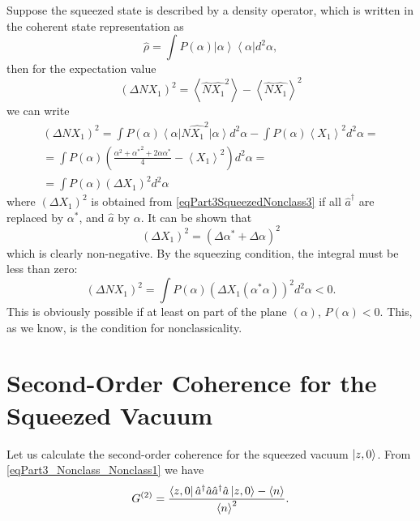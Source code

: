 Suppose the squeezed state is described by a density operator,
which is written in the coherent state representation as
\[
\hat{\rho} = \int P\left(\alpha\right)
\left|\alpha\right>
\left<\alpha\right| d^2 \alpha,
\]
then for the expectation value 
\begin{equation}
\left(\Delta N X_1\right)^2 = 
\left<\hat{N} \hat{X_1}^2\right> - \left<\hat{N} \hat{X_1}\right>^2 
\label{eqPart3SqueezedNonclass3}
\end{equation}
we can write
\begin{eqnarray}
  \left(\Delta N X_1\right)^2 =
  \int P\left(\alpha\right)
  \left<\alpha\right|
  \hat{N} \hat{X_1}^2
  \left|\alpha\right> d^2 \alpha -
  \int P\left(\alpha\right)
  \left< X_1 \right>^2
  d^2 \alpha
  =
  \nonumber \\
  =
  \int  
  P\left(\alpha\right)
  \left(
  \frac{
    \alpha^2 + {\alpha^\ast}^2 +
    2 \alpha \alpha^\ast}{4}
  - \left< X_1 \right>^2
  \right)
   d^2 \alpha
  =
  \nonumber \\
  =
 \int 
P\left(\alpha\right)
\left(\Delta X_1\right)^2
d^2 \alpha
\end{eqnarray}
where $\left(\Delta X_1\right)^2$ is obtained from
\eqref{eqPart3SqueezedNonclass3} if all $\hat{a}^{\dag}$ are replaced by
$\alpha^{*}$, and $\hat{a}$ by $\alpha$. It can be shown that
\[
\left(\Delta X_1\right)^2 = \left(\Delta \alpha^{*} + \Delta \alpha\right)^2
\]
which is clearly non-negative. By the squeezing condition, the integral must
be less than zero:
\begin{equation}
\left(\Delta N X_1\right)^2 = 
 \int 
P\left(\alpha\right)
\left(\Delta X_1\left(\alpha^{*}\alpha\right)\right)^2
d^2 \alpha < 0.
\nonumber
\end{equation}
This is obviously possible if at least on part of the plane
$\left(\alpha\right)$, $P\left(\alpha\right) < 0$. This, as we know,
is the condition for nonclassicality. 

\section{Second-Order Coherence for the Squeezed Vacuum}

Let us calculate the second-order coherence for the squeezed vacuum
$\ket{z, 0}$. From \eqref{eqPart3_Nonclass_Nonclass1} we have
\[
G^{(2)} = \frac{\bra{z,0}\hat{a}^{\dag}\hat{a}\hat{a}^{\dag}\hat{a}\ket{z,0}
- \left<n\right>}{\left<n\right>^2}.
\]

